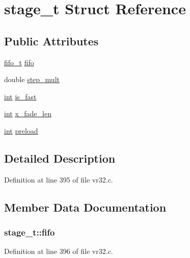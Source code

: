 \hypertarget{structstage__t}{}\section{stage\+\_\+t Struct Reference}
\label{structstage__t}
\subsection*{Public Attributes}
\begin{DoxyCompactItemize}
\item 
\hyperlink{structfifo__t}{fifo\+\_\+t} \hyperlink{structstage__t_a61317dd3504269db6ec8ab19432e92f7}{fifo}
\item 
double \hyperlink{structstage__t_afce5990acce8fa9c2f0b0df755585596}{step\+\_\+mult}
\item 
\hyperlink{xmltok_8h_a5a0d4a5641ce434f1d23533f2b2e6653}{int} \hyperlink{structstage__t_a7956a87a6fc6f8d8586d1efc6c9af64c}{is\+\_\+fast}
\item 
\hyperlink{xmltok_8h_a5a0d4a5641ce434f1d23533f2b2e6653}{int} \hyperlink{structstage__t_ad5161819fd34700f9628a37bf4f398b7}{x\+\_\+fade\+\_\+len}
\item 
\hyperlink{xmltok_8h_a5a0d4a5641ce434f1d23533f2b2e6653}{int} \hyperlink{structstage__t_a7bf43299a116ecf6bd77efdd78d4d7cc}{preload}
\end{DoxyCompactItemize}


\subsection{Detailed Description}


Definition at line 395 of file vr32.\+c.



\subsection{Member Data Documentation}
\subsubsection[{\texorpdfstring{fifo}{fifo}}]{ stage\+\_\+t\+::fifo}\hypertarget{structstage__t_a61317dd3504269db6ec8ab19432e92f7}{}\label{structstage__t_a61317dd3504269db6ec8ab19432e92f7}


Definition at line 396 of file vr32.\+c.

